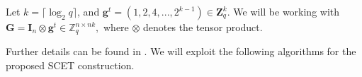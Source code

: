 \documentclass[a4paper,11pt,onecolumn]{elsarticle}
\begin{document}
Let $ k = \lceil \log_2 q \rceil $, and $ \mathbf{g}^t = (1,2,4,...,2^{k-1}) \in \mathbf{Z}^{k}_q  $.  We will be working with 
$ \mathbf{G} = \mathbf{I}_n\otimes \mathbf{g}^t \in \mathbb{Z}_q^{n\times nk}, $ where $ \otimes $ denotes the tensor product. 
\iffalse
That is,
\[ \mathbf{G} = \left[\begin{matrix}
\mathbf{g}^t&&&\\
&\mathbf{g}^t&&\\
&& \ddots &\\
&&&\mathbf{g}^t\\
\end{matrix}\right] \in \mathbb{Z}_q^{n\times nk}. \]
\begin{thm}[{\cite[Theorem 4.1]{MP12}}]
	For any integers $ q \ge 2, n \geq 1,  k = \lceil \log _2 q \rceil $, there is a primitive matrix $ \mathbf{G} \in \mathbb{Z}_q^{n\times nk} $ such that
	\begin{itemize}
		\item The lattice $ \Lambda^\bot(\mathbf{G}) $ has a known basis $ \mathbf{S}\in \mathbb{Z}^{nk\times nk} $ with $ \|\widetilde{\mathbf{S}}\| \le \sqrt{5} $ and $ \|\mathbf{S}\| \le \max \{\sqrt{5},\sqrt{k}\} $.
		\item Both $ \mathbf{G} $ and $ \mathbf{S} $ require little storage. In particular, they are sparse (with only $ O(nk) $ nonzero entries) and highly structured.
	\end{itemize}
\end{thm}
\fi
 Further details can be found in \cite{MP12}. We will exploit the  following algorithms for the proposed \textsf{SCET} construction. 


\end{document}

